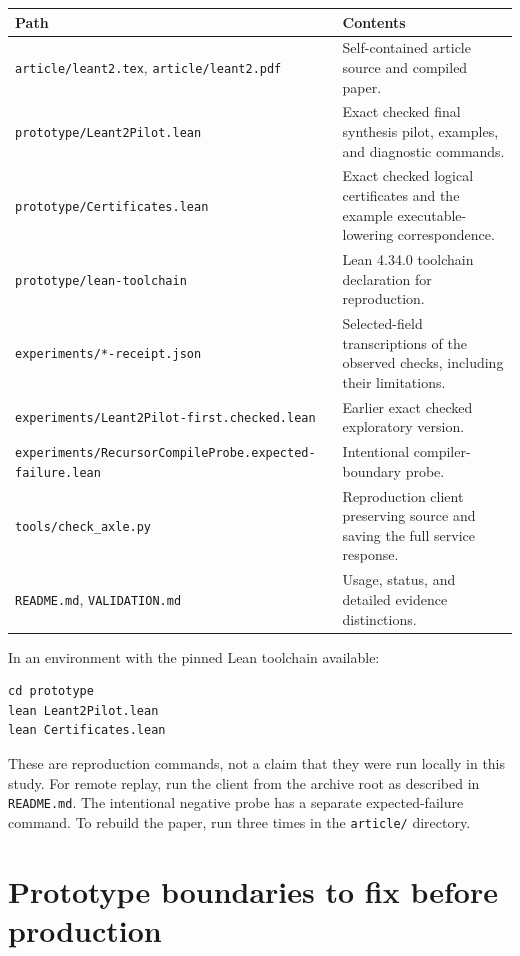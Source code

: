 \documentclass[11pt,a4paper]{article}
\newcommand{\code}[1]{\texttt{\detokenize{#1}}}
\newcommand{\File}[1]{\nolinkurl{#1}}
\theoremstyle{remark}
\begin{document}
\begin{center}
\begin{tabularx}{\textwidth}{@{}L{0.46\textwidth}Y@{}}
\toprule
Path & Contents \\
\midrule
\File{article/leant2.tex}, \File{article/leant2.pdf} & Self-contained article source and compiled paper. \\
\File{prototype/Leant2Pilot.lean} & Exact checked final synthesis pilot, examples, and diagnostic commands. \\
\File{prototype/Certificates.lean} & Exact checked logical certificates and the example executable-lowering correspondence. \\
\File{prototype/lean-toolchain} & Lean 4.34.0 toolchain declaration for reproduction. \\
\File{experiments/*-receipt.json} & Selected-field transcriptions of the observed checks, including their limitations. \\
\File{experiments/Leant2Pilot-first.checked.lean} & Earlier exact checked exploratory version. \\
\File{experiments/RecursorCompileProbe.expected-failure.lean} & Intentional compiler-boundary probe. \\
\File{tools/check_axle.py} & Reproduction client preserving source and saving the full service response. \\
\File{README.md}, \File{VALIDATION.md} & Usage, status, and detailed evidence distinctions. \\
\bottomrule
\end{tabularx}
\end{center}

In an environment with the pinned Lean toolchain available:
\begin{lstlisting}[language={}]
cd prototype
lean Leant2Pilot.lean
lean Certificates.lean
\end{lstlisting}
These are reproduction commands, not a claim that they were run locally in this study. For remote replay, run the client from the archive root as described in \File{README.md}. The intentional negative probe has a separate expected-failure command. To rebuild the paper, run \code{pdflatex} three times in the \File{article/} directory.

\section{Prototype boundaries to fix before production}\label{app:pilotlimits}
\end{document}
